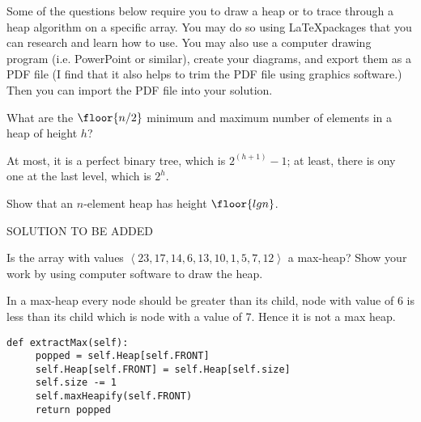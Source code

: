 \documentclass[11pt,addpoints]{exam}
\begin{document}
Some of the questions below require you to draw a heap or to trace through a heap algorithm on a specific array.  You may do so using \LaTeX packages that you can research and learn how to use.  You may also use a computer drawing program (i.e. PowerPoint or similar), create your diagrams, and export them as a PDF file (I find that it also helps to trim the PDF file using graphics software.)  Then you can import the PDF file into your solution.
\begin{questions}
%
\question[5]
What are the $\floor{n/2}$ minimum and maximum number of elements in a heap of height $h$?
\newline

\begin{solutionorbox}
At most, it is a perfect binary tree, which is $2^(h+1) - 1$; at least, there is ony one at the last level, which is $2^h$.
\end{solutionorbox}


\ifprintanswers
\newpage
\else
\bigskip
\fi


%
\question[5]
Show that an $n$-element heap has height $\floor{lg n}$.

\begin{solutionorbox}
SOLUTION TO BE ADDED
\end{solutionorbox}

\ifprintanswers
\newpage
\else
\bigskip
\fi


%
\question[5]
Is the array with values $\left<23, 17, 14, 6, 13, 10, 1, 5, 7, 12\right>$ a max-heap?  Show your work by using computer software to draw the heap.

\begin{solutionorbox}
	\newline
	In a max-heap every node should be greater than its child, node with value of 6 is less than its child which is node with a value of 7. Hence it is not a max heap.
\begin{verbatim}
def extractMax(self):  
     popped = self.Heap[self.FRONT]
     self.Heap[self.FRONT] = self.Heap[self.size]
     self.size -= 1
     self.maxHeapify(self.FRONT)          
     return popped


\end{verbatim}
\end{solutionorbox}
\end{questions}
\end{document}
